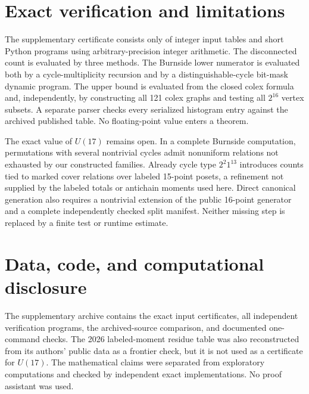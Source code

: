 \documentclass[11pt]{amsart}
\theoremstyle{definition}
\begin{document}
\section{Exact verification and limitations}

The supplementary certificate consists only of integer input tables and
short Python programs using arbitrary-precision integer arithmetic.  The
disconnected count is evaluated by three methods.  The Burnside lower
numerator is evaluated both by a cycle-multiplicity recursion and by a
distinguishable-cycle bit-mask dynamic program.  The upper bound is evaluated
from the closed colex formula and, independently, by constructing all 121
colex graphs and testing all $2^{16}$ vertex subsets.  A separate parser
checks every serialized histogram entry against the archived published
table.  No floating-point value enters a theorem.

The exact value of $U(17)$ remains open.  In a complete Burnside computation,
permutations with several nontrivial cycles admit nonuniform relations not
exhausted by our constructed families.  Already cycle type $2^2 1^{13}$
introduces counts tied to marked cover relations over labeled 15-point
posets, a refinement not supplied by the labeled totals or antichain moments
used here.  Direct canonical generation also requires a nontrivial extension
of the public 16-point generator and a complete independently checked split
manifest.  Neither missing step is replaced by a finite test or runtime
estimate.

\section*{Data, code, and computational disclosure}

The supplementary archive contains the exact input certificates, all
independent verification programs, the archived-source comparison, and
documented one-command checks.  The 2026 labeled-moment residue table was also
reconstructed from its authors' public data as a frontier check, but it is not
used as a certificate for $U(17)$.  The mathematical claims were separated
from exploratory computations and checked by independent exact
implementations.  No proof assistant was used.



\end{document}
